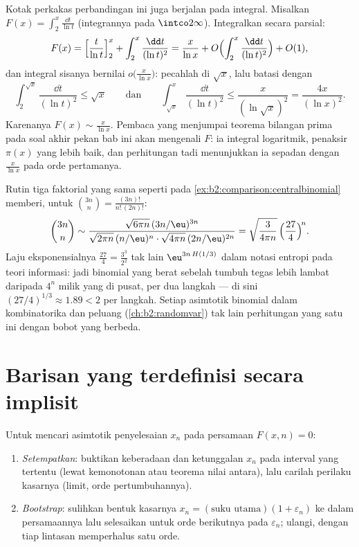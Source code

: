 \begin{example}\label{ex:b2:comparison:liworked}
Kotak perkakas perbandingan ini juga berjalan pada integral. Misalkan
$F(x) = \int_2^x\frac{\dd t}{\ln t}$ (integrannya  pada
$\intco2\infty$). Integralkan secara parsial:
\[
F(x) = \Bigl[\frac{t}{\ln t}\Bigr]_2^x +
\int_2^x\frac{\dd t}{(\ln t)^2}
= \frac{x}{\ln x} + O\Bigl(\int_2^x\frac{\dd t}{(\ln
t)^2}\Bigr) + O(1),
\]
dan integral sisanya bernilai $o\bigl(\frac{x}{\ln x}\bigr)$:
pecahlah di $\sqrt x$, lalu batasi dengan
\[
\int_2^{\sqrt x}\frac{\dd t}{(\ln t)^2} \leq \sqrt x
\qquad\text{dan}\qquad
\int_{\sqrt x}^{x}\frac{\dd t}{(\ln t)^2} \leq
\frac{x}{(\ln\sqrt x)^2} = \frac{4x}{(\ln x)^2} .
\]
Karenanya $F(x) \sim \frac{x}{\ln x}$. Pembaca yang menjumpai teorema
bilangan prima pada soal akhir pekan bab ini akan mengenali
$F$: ia integral logaritmik, penaksir $\pi(x)$ yang lebih baik, dan
perhitungan tadi menunjukkan ia sepadan dengan
$\frac{x}{\ln x}$ pada orde pertamanya.
\end{example}

\begin{example}\label{ex:b2:comparison:lopsided}
Rutin tiga faktorial yang sama seperti pada
\cref{ex:b2:comparison:centralbinomial} memberi, untuk
$\binom{3n}{n} = \frac{(3n)!}{n!\,(2n)!}$:
\[
\binom{3n}{n} \sim
\frac{\sqrt{6\pi n}\,(3n/\eu)^{3n}}
{\sqrt{2\pi n}\,(n/\eu)^{n}\cdot\sqrt{4\pi n}\,(2n/\eu)^{2n}}
= \sqrt{\frac{3}{4\pi n}}\,
\Bigl(\frac{27}{4}\Bigr)^{\!n} .
\]
Laju eksponensialnya $\frac{27}4 = \frac{3^3}{2^2}$ tak lain
$\eu^{3n\,H(1/3)}$ dalam notasi entropi pada teori informasi:
jadi binomial yang berat sebelah tumbuh tegas lebih lambat daripada
$4^n$ milik yang di pusat, per dua langkah --- di sini $(27/4)^{1/3}
\approx 1.89 < 2$ per langkah. Setiap asimtotik binomial dalam
kombinatorika dan peluang (\cref{ch:b2:randomvar}) tak lain perhitungan
yang satu ini dengan bobot yang berbeda.
\end{example}

\section{Barisan yang terdefinisi secara implisit}

\begin{method}\label{met:b2:comparison:implicit}
Untuk mencari asimtotik penyelesaian $x_n$ pada persamaan $F(x, n) =
0$:
\begin{enumerate}
  \item \emph{Setempatkan}: buktikan keberadaan dan ketunggalan $x_n$
        pada interval yang tertentu (lewat kemonotonan atau teorema
        nilai antara), lalu carilah perilaku kasarnya (limit, orde
        pertumbuhannya).
  \item \emph{Bootstrap}: sulihkan bentuk kasarnya $x_n = (\text{suku
        utama})(1 + \varepsilon_n)$ ke dalam persamaannya lalu
        selesaikan untuk orde berikutnya pada $\varepsilon_n$; ulangi,
        dengan tiap lintasan memperhalus satu orde.
\end{enumerate}
\end{method}

